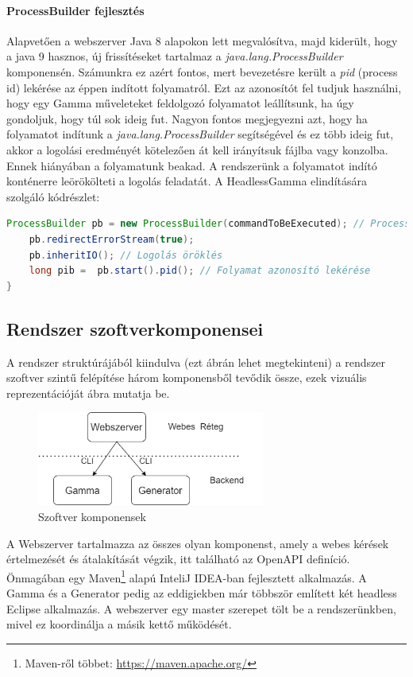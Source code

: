 \paragraph{ProcessBuilder fejlesztés} Alapvetően a webszerver Java 8 alapokon lett megvalósítva, majd kiderült, hogy a java 9 hasznos, új frissítéseket tartalmaz a \textit{java.lang.ProcessBuilder} komponensén. Számunkra ez azért fontos, mert bevezetésre került a \textit{pid} (process id) lekérése az éppen indított folyamatról. Ezt az azonosítót fel tudjuk használni, hogy egy Gamma műveleteket feldolgozó folyamatot leállítsunk, ha úgy gondoljuk, hogy túl sok ideig fut.
Nagyon fontos megjegyezni azt, hogy ha folyamatot indítunk a \textit{java.lang.ProcessBuilder} segítségével és ez több ideig fut, akkor a logolási eredményét kötelezően át kell irányítsuk fájlba vagy konzolba. Ennek hiányában a folyamatunk beakad. A rendszerünk a folyamatot indító konténerre leörökölteti a logolás feladatát. A HeadlessGamma elindítására szolgáló kódrészlet:

\begin{lstlisting}[language=Java]
	ProcessBuilder pb = new ProcessBuilder(commandToBeExecuted); // ProcessBuilder inicializálás, commandToBeExecuted a futtatni kivánt parancs karakterláncát tartalmazza
	pb.redirectErrorStream(true);
	pb.inheritIO(); // Logolás öröklés
	long pib =  pb.start().pid(); // Folyamat azonosító lekérése
}
\end{lstlisting}


\subsection{Rendszer szoftverkomponensei}

A rendszer struktúrájából kiindulva (ezt  ábrán lehet megtekinteni) a rendszer szoftver szintű felépítése három komponensből tevődik össze, ezek vizuális reprezentációját  ábra mutatja be.

\begin{figure}[t]
	\centering
	\includegraphics[width=75mm, keepaspectratio]{figures/software_components.png}
	\caption{Szoftver komponensek}
	\label{fig:software_components}
\end{figure}

A Webszerver tartalmazza az összes olyan komponenst, amely a webes kérések értelmezését és átalakítását végzik, itt található az OpenAPI definíció. Önmagában egy Maven\footnote{Maven-ről többet: \url{https://maven.apache.org/}} alapú InteliJ IDEA-ban fejlesztett alkalmazás. A Gamma és a Generator pedig az eddigiekben már többször említett két headless Eclipse alkalmazás. A webszerver egy master szerepet tölt be a rendszerünkben, mivel ez koordinálja a másik kettő működését.
